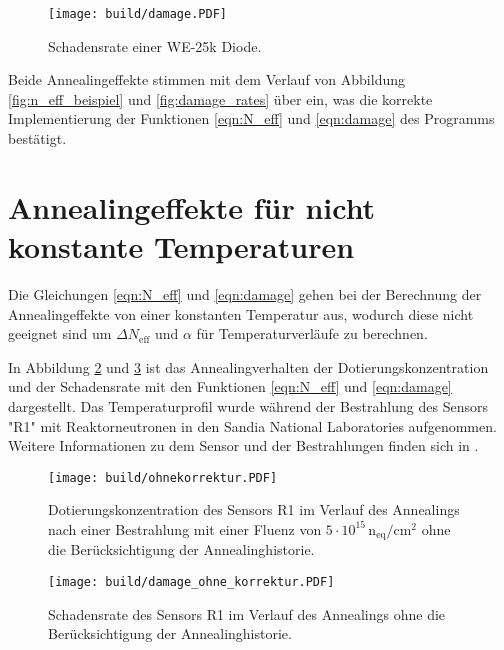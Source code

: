 \begin{figure}
  \centering
    \texttt{[image: build/damage.PDF]}
    \caption{Schadensrate einer WE-25k Diode.}
    \label{fig:damage}
\end{figure}

Beide Annealingeffekte stimmen mit dem Verlauf von Abbildung \ref{fig:n_eff_beispiel} und \ref{fig:damage_rates} über ein, was
die korrekte Implementierung der Funktionen \ref{eqn:N_eff} und \ref{eqn:damage}  des Programms
bestätigt.



\section{Annealingeffekte für nicht konstante Temperaturen}{\label{nicht_konstant}}
Die Gleichungen \ref{eqn:N_eff} und \ref{eqn:damage} gehen bei der Berechnung der Annealingeffekte von
einer konstanten Temperatur aus, wodurch diese nicht geeignet sind um $\Delta N_{\mathrm{eff}}$ und $\alpha$ für
Temperaturverläufe zu berechnen.


In Abbildung \ref{fig:N_eff_ohne} und \ref{fig:damage_ohne} ist das Annealingverhalten
der Dotierungskonzentration und der Schadensrate mit
den Funktionen \ref{eqn:N_eff} und \ref{eqn:damage} dargestellt.
Das Temperaturprofil wurde während der Bestrahlung
des Sensors "R1" mit Reaktorneutronen in den
Sandia National Laboratories aufgenommen.
Weitere Informationen zu dem Sensor und
der Bestrahlungen finden sich in \cite{mareike}.

\begin{figure}
  \centering
    \texttt{[image: build/ohnekorrektur.PDF]}
    \caption{Dotierungskonzentration des Sensors R1 im Verlauf des Annealings nach einer Bestrahlung mit einer Fluenz von
    $5\cdot 10^{15} \, \mathrm{n_{eq}/cm^2}$ ohne die Berücksichtigung der Annealinghistorie.}
    \label{fig:N_eff_ohne}
\end{figure}

\begin{figure}
  \centering
    \texttt{[image: build/damage\_ohne\_korrektur.PDF]}
    \caption{Schadensrate des Sensors R1 im Verlauf des Annealings ohne die Berücksichtigung der Annealinghistorie.}
    \label{fig:damage_ohne}
\end{figure}

